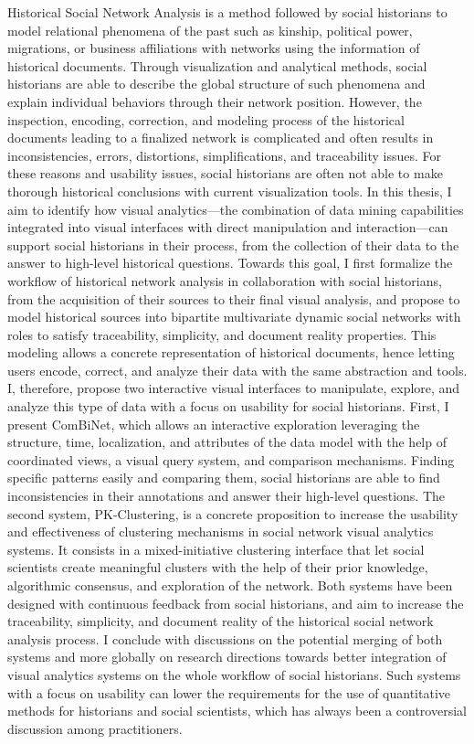 \newcommand{\abstracteng}{
Historical Social Network Analysis is a method followed by social historians to model relational phenomena of the past such as kinship, political power, migrations, or business affiliations with networks using the information of historical documents.
Through visualization and analytical methods, social historians are able to describe the global structure of such phenomena and explain individual behaviors through their network position.
However, the inspection, encoding, correction, and modeling process of the historical documents leading to a finalized network is complicated and often results in inconsistencies, errors, distortions, simplifications, and traceability issues.
For these reasons and usability issues, social historians are often not able to make thorough historical conclusions with current visualization tools. 
In this thesis, I aim to identify how visual analytics---the combination of data mining capabilities integrated into visual interfaces with direct manipulation and interaction---can support social historians in their process, from the collection of their data to the answer to high-level historical questions.
Towards this goal, I first formalize the workflow of historical network analysis in collaboration with social historians, from the acquisition of their sources to their final visual analysis, and propose to model historical sources into bipartite multivariate dynamic social networks with roles to satisfy traceability, simplicity, and document reality properties.
This modeling allows a concrete representation of historical documents, hence letting users encode, correct, and analyze their data with the same abstraction and tools.
I, therefore, propose two interactive visual interfaces to manipulate, explore, and analyze this type of data with a focus on usability for social historians.
First, I present ComBiNet, which allows an interactive exploration leveraging the structure, time, localization, and attributes of the data model with the help of coordinated views, a visual query system, and comparison mechanisms. 
Finding specific patterns easily and comparing them, social historians are able to find inconsistencies in their annotations and answer their high-level questions.
The second system, PK-Clustering, is a concrete proposition to increase the usability and effectiveness of clustering mechanisms in social network visual analytics systems. It consists in a mixed-initiative clustering interface that let social scientists create meaningful clusters with the help of their prior knowledge, algorithmic consensus, and exploration of the network.
Both systems have been designed with continuous feedback from social historians, and aim to increase the traceability, simplicity, and document reality of the historical social network analysis process.
I conclude with discussions on the potential merging of both systems and more globally on research directions towards better integration of visual analytics systems on the whole workflow of social historians.
Such systems with a focus on usability can lower the requirements for the use of quantitative methods for historians and social scientists, which has always been a controversial discussion among practitioners.
}

\abstracteng